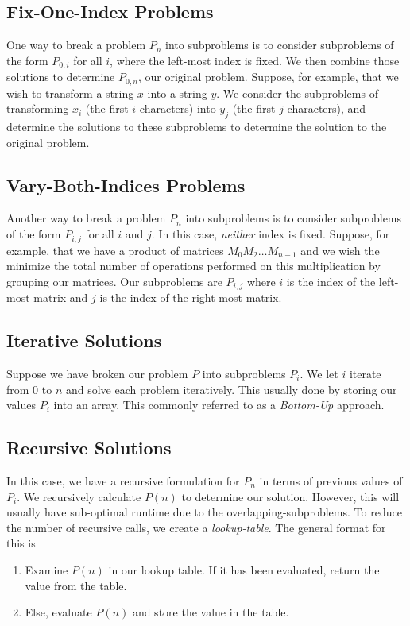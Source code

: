 \subsection{Fix-One-Index Problems}
One way to break a problem $P_n$ into subproblems is to consider subproblems of the form $P_{0,i}$ for all $i$, where the left-most index is fixed. We then combine those solutions to determine $P_{0,n}$, our original problem. Suppose, for example, that we wish to transform a string $x$ into a string $y$. We consider the subproblems of transforming $x_i$ (the first $i$ characters) into $y_j$ (the first $j$ characters), and determine the solutions to these subproblems to determine the solution to the original problem.
\subsection{Vary-Both-Indices Problems}
Another way to break a problem $P_n$ into subproblems is to consider subproblems of the form $P_{i,j}$ for all $i$ and $j$. In this case, \textit{neither} index is fixed. Suppose, for example, that we have a product of matrices $M_0M_2\hdots M_{n-1}$ and we wish the minimize the total number of operations performed on this multiplication by grouping our matrices. Our subproblems are $P_{i,j}$ where $i$ is the index of the left-most matrix and $j$ is the index of the right-most matrix.
\subsection{Iterative Solutions}
Suppose we have broken our problem $P$ into subproblems $P_{i}$. We let $i$ iterate from $0$ to $n$ and solve each problem iteratively. This usually done by storing our values $P_i$ into an array. This commonly referred to as a \textit{Bottom-Up} approach.
\subsection{Recursive Solutions}
In this case, we have a recursive formulation for $P_n$ in terms of previous values of $P_i$. We recursively calculate $P(n)$ to determine our solution. However, this will usually have sub-optimal runtime due to the overlapping-subproblems. To reduce the number of recursive calls, we create a \textit{lookup-table}. The general format for this is
\begin{enumerate}
    \item Examine $P(n)$ in our lookup table. If it has been evaluated, return the value from the table.
    \item Else, evaluate $P(n)$ and store the value in the table.
\end{enumerate}

